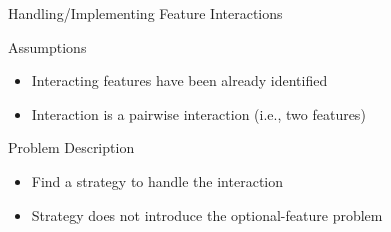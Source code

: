 \begin{frame}{Handling/Implementing Feature Interactions}
	\begin{fancycolumns}
		\begin{note}{Assumptions}
			\begin{itemize}
				\item Interacting features have been already identified
				\item Interaction is a pairwise interaction (i.e., two features)
			\end{itemize}
		\end{note}
	\nextcolumn
		\begin{definition}{Problem Description}
			\begin{itemize}
				\item Find a strategy to handle the interaction 
				\item Strategy does not introduce the optional-feature problem %
			\end{itemize}
		\end{definition}
	\end{fancycolumns}
\end{frame}

%

